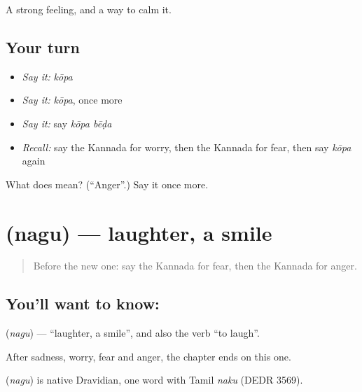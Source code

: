 \begin{grammarlens}[title={What you've built}]
A strong feeling, and a way to calm it.
\end{grammarlens}

\subsection*{Your turn}
\begin{itemize}
\raggedright
  \item \emph{Say it:} \emph{kōpa}
  \item \emph{Say it:} \emph{kōpa}, once more
  \item \emph{Say it:} say \emph{kōpa bēḍa}
  \item \emph{Recall:} say the Kannada for worry, then the Kannada for fear, then say \emph{kōpa} again
\end{itemize}

\begin{tcolorbox}[breakable,colback=teal!4,colframe=teal!35!black,title={Before you move on}]
What does  mean? (\textquotedblleft{}Anger\textquotedblright{}.) Say it once more.
\end{tcolorbox}
\section[\texorpdfstring{\kn{ನಗು} (nagu)}{ನಗು (nagu)}]{ (nagu) — laughter, a smile}

\label{lesson:KA-C83-laughter}



\begin{quote}
Before the new one: say the Kannada for fear, then the Kannada for anger.
\end{quote}

\subsection*{You'll want to know: }
\textbf{} (\emph{nagu}) — \textquotedblleft{}laughter, a smile\textquotedblright{}, and also the verb \textquotedblleft{}to laugh\textquotedblright{}.

After sadness, worry, fear and anger, the chapter ends on this one.

\begin{cousinweb}
\textbf{} (\emph{nagu}) is native Dravidian, one word with Tamil \emph{naku} (DEDR 3569).
\end{cousinweb}

